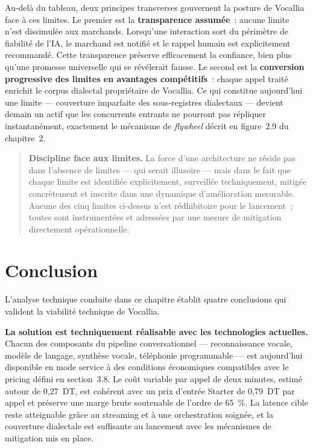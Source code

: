 Au-delà du tableau, deux principes transverses gouvernent la posture de Vocallia face à ces limites. Le premier est la \textbf{transparence assumée}~: aucune limite n'est dissimulée aux marchands. Lorsqu'une interaction sort du périmètre de fiabilité de l'IA, le marchand est notifié et le rappel humain est explicitement recommandé. Cette transparence préserve efficacement la confiance, bien plus qu'une promesse universelle qui se révélerait fausse. Le second est la \textbf{conversion progressive des limites en avantages compétitifs}~: chaque appel traité enrichit le corpus dialectal propriétaire de Vocallia. Ce qui constitue aujourd'hui une limite — couverture imparfaite des sous-registres dialectaux — devient demain un actif que les concurrents entrants ne pourront pas répliquer instantanément, exactement le mécanisme de \emph{flywheel} décrit en figure~2.9 du chapitre~2.

\begin{quote}
\textbf{Discipline face aux limites.} La force d'une architecture ne réside pas dans l'absence de limites — qui serait illusoire — mais dans le fait que chaque limite est identifiée explicitement, surveillée techniquement, mitigée concrètement et inscrite dans une dynamique d'amélioration mesurable. Aucune des cinq limites ci-dessus n'est rédhibitoire pour le lancement~; toutes sont instrumentées et adressées par une mesure de mitigation directement opérationnelle.
\end{quote}

\section{Conclusion}
\label{sec:conclusion_chap4}

L'analyse technique conduite dans ce chapitre établit quatre conclusions qui valident la viabilité technique de Vocallia.

\textbf{La solution est techniquement réalisable avec les technologies actuelles.} Chacun des composants du pipeline conversationnel — reconnaissance vocale, modèle de langage, synthèse vocale, téléphonie programmable — est aujourd'hui disponible en mode service à des conditions économiques compatibles avec le pricing défini en section~3.8. Le coût variable par appel de deux minutes, estimé autour de 0{,}27~DT, est cohérent avec un prix d'entrée Starter de 0{,}79~DT par appel et préserve une marge brute soutenable de l'ordre de 65~\%. La latence cible reste atteignable grâce au streaming et à une orchestration soignée, et la couverture dialectale est suffisante au lancement avec les mécanismes de mitigation mis en place.


